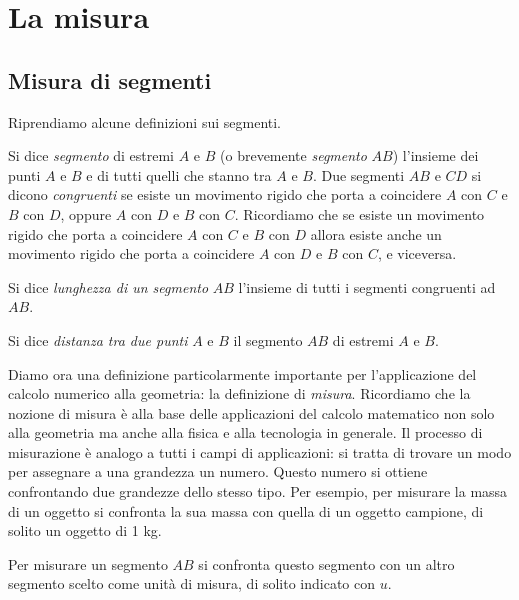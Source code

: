 \ovalbox{\ref{ese:1.79}, \ref{ese:1.80}, \ref{ese:1.81}, \ref{ese:1.82}, \ref{ese:1.83}, \ref{ese:1.84}, \ref{ese:1.85}, \ref{ese:1.86}, \ref{ese:1.87}, \ref{ese:1.88}, \ref{ese:1.89}, \ref{ese:1.90}, \ref{ese:1.91}, \ref{ese:1.92},\ref{ese:1.93}, \ref{ese:1.94}, \ref{ese:1.95},}

\ovalbox{\ref{ese:1.96}, \ref{ese:1.97}, \ref{ese:1.98}, \ref{ese:1.99}, \ref{ese:1.100}, \ref{ese:1.101}, \ref{ese:1.102}, \ref{ese:1.103}}


\section{La misura}\label{sect:misura}

\subsection{Misura di segmenti}

Riprendiamo alcune definizioni sui segmenti.

Si dice \emph{segmento} di estremi $A$ e $B$ (o brevemente \emph{segmento} $AB$) l'insieme dei punti $A$ e $B$ e di tutti quelli che stanno tra $A$ e $B$.
Due segmenti $AB$ e $CD$ si dicono \emph{congruenti} se esiste un movimento rigido che porta a coincidere $A$ con $C$ e $B$ con $D$, oppure $A$ con $D$ e $B$ con $C$. Ricordiamo che se esiste un movimento rigido che porta a coincidere $A$ con $C$ e $B$ con $D$ allora esiste anche un movimento rigido che porta a coincidere $A$ con $D$ e $B$ con $C$, e viceversa.

Si dice \emph{lunghezza di un segmento} $AB$ l'insieme di tutti i segmenti congruenti ad $AB$.

Si dice \emph{distanza tra due punti} $A$ e $B$ il segmento $AB$ di estremi $A$ e $B$.

Diamo ora una definizione particolarmente importante per l'applicazione del calcolo numerico alla geometria: la definizione di \emph{misura}. Ricordiamo che la nozione di misura è alla base delle applicazioni del calcolo matematico non solo alla geometria ma anche alla fisica e alla tecnologia in generale. Il processo di misurazione è analogo a tutti i campi di applicazioni: si tratta di trovare un modo per assegnare a una grandezza un numero. Questo numero si ottiene confrontando due grandezze dello stesso tipo. Per esempio, per misurare la massa di un oggetto si confronta la sua massa con quella di un oggetto campione, di solito un oggetto di 1 kg.

Per misurare un segmento $AB$ si confronta questo segmento con un altro segmento scelto come unità di misura, di solito indicato con $u$.

